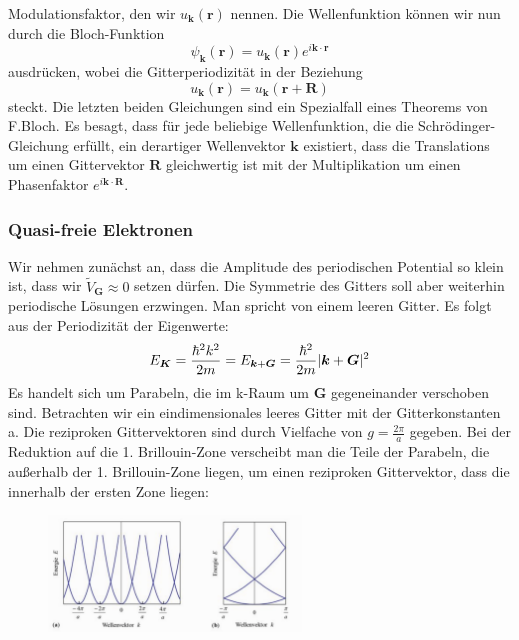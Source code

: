 \documentclass[11pt]{article}
\DeclarePairedDelimiter\abs{\lvert}{\rvert}
\begin{document}
Modulationsfaktor, den wir $u_{\bm{k}}(\bm{r})$ nennen.
Die Wellenfunktion können wir nun durch die Bloch-Funktion
\begin{equation}
  \psi_{\bm{k}}(\bm{r})=u_{\bm{k}}(\bm{r})e^{i\bm{k}\cdot\bm{r}}
\end{equation}
ausdrücken, wobei die Gitterperiodizität in der Beziehung
\begin{equation}
  u_{\bm{k}}(\bm{r})=u_{\bm{k}}(\bm{r}+\bm{R})
\end{equation}
steckt. Die letzten beiden Gleichungen sind ein Spezialfall eines Theorems von
F.Bloch. Es besagt, dass für jede beliebige Wellenfunktion, die die Schrödinger-
Gleichung erfüllt, ein derartiger Wellenvektor $\bm{k}$ existiert, dass die
Translations um einen Gittervektor $\bm{R}$ gleichwertig ist mit der
Multiplikation um einen Phasenfaktor $e^{i\bm{k}\cdot\bm{R}}$.
\subsubsection{Quasi-freie Elektronen}
Wir nehmen zunächst an, dass die Amplitude des periodischen Potential so klein
ist, dass wir $\tilde{V}_{\bm{G}}\approx 0$ setzen dürfen. Die Symmetrie des
Gitters soll aber weiterhin periodische Lösungen erzwingen. Man spricht von
einem leeren Gitter. Es folgt aus der Periodizität der Eigenwerte:
\begin{equation}
  E_{\bm{K}}=\frac{\hbar^2k^2}{2m}=E_{\bm{k}+\bm{G}}=\frac{\hbar^2}{2m}
  \abs{\bm{k}+\bm{G}}^2
\end{equation}
Es handelt sich um Parabeln, die im k-Raum um $\bm{G}$ gegeneinander verschoben
sind. Betrachten wir ein eindimensionales leeres Gitter mit der Gitterkonstanten
a. Die reziproken Gittervektoren sind durch Vielfache von $g=\frac{2\pi}{a}$
gegeben. Bei der Reduktion auf die 1. Brillouin-Zone verscheibt man die Teile
der Parabeln, die außerhalb der 1. Brillouin-Zone liegen, um einen reziproken
Gittervektor, dass die innerhalb der ersten Zone liegen:
\begin{figure}[h]
\includegraphics[width=0.6\textwidth]{bloch}
\centering
\label{fig:bloch}
\end{figure}
\end{document}
